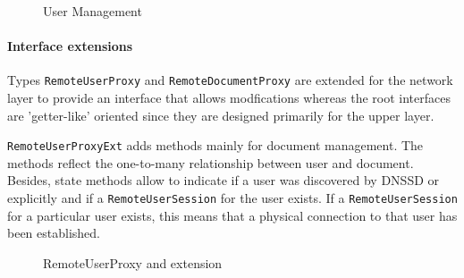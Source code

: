 \begin{figure}[H]
 \centering
 \caption{User Management}
 \label{fig:network.discovery.usermanagement}
\end{figure}

\paragraph{Interface extensions}
Types  \texttt{RemoteUserProxy}  and  \texttt{RemoteDocumentProxy} are extended for the network layer to provide an interface that allows modfications whereas the root interfaces are 'getter-like' oriented since they are designed primarily for the upper layer.

 \texttt{RemoteUserProxyExt} adds methods mainly for document management. The methods reflect the one-to-many relationship between user and document. Besides, state methods allow to indicate if a user was discovered by DNSSD or explicitly and if a \texttt{RemoteUserSession} for the user exists. If a \texttt{RemoteUserSession} for a particular user exists, this means that a physical connection to that user has been established.

\begin{figure}[H]
 \centering
 \caption{RemoteUserProxy and extension}
 \label{fig:network.discovery.remoteuserproxy.uml}
\end{figure}


